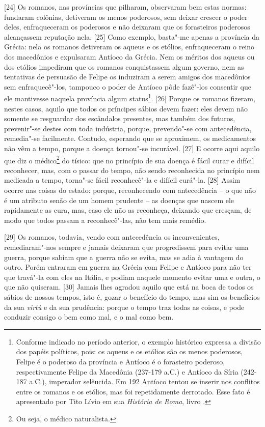 {[}24{]} Os romanos, nas províncias que pilharam, observaram bem estas
normas: fundaram colônias, detiveram os menos poderosos, sem deixar
crescer o poder deles, enfraqueceram os poderosos e não deixaram que os
forasteiros poderosos alcançassem reputação nela. {[}25{]} Como exemplo,
basta"-me apenas a província da Grécia: nela os romanos detiveram os
aqueus e os etólios, enfraqueceram o reino dos macedônios e expulsaram
Antíoco da Grécia. Nem os méritos dos aqueus ou dos etólios impediram
que os romanos conquistassem algum governo, nem as tentativas de
persuasão de Felipe os induziram a serem amigos dos macedônios sem
enfraquecê"-los, tampouco o poder de Antíoco pôde fazê"-los consentir que
ele mantivesse naquela província algum status\footnote{Conforme indicado
  no período anterior, o exemplo histórico expressa a divisão dos papéis
  políticos, pois: os aqueus e os etólios são os menos poderosos, Felipe
  é o poderoso da província e Antíoco é o forasteiro poderoso,
  respectivamente Felipe  da Macedônia (237-179 a.C.) e Antíoco  da
  Síria (242- 187 a.C.), imperador selêucida. Em 192 Antíoco tentou se
  inserir nos conflitos entre os romanos e os etólios, mas foi
  repetidamente derrotado. Esse fato é apresentado por Tito Lívio em sua
  \emph{História de Roma}, livro .}. {[}26{]} Porque os romanos
fizeram, nestes casos, aquilo que todos os príncipes sábios devem fazer:
eles devem não somente se resguardar dos escândalos presentes, mas
também dos futuros, prevenir"-se destes com toda indústria, porque,
prevendo"-se com antecedência, remedia"-se facilmente. Contudo, esperando
que se aproximem, os medicamentos não vêm a tempo, porque a doença
tornou"-se incurável. {[}27{]} E ocorre aqui aquilo que diz o
médico\footnote{Ou seja, o médico naturalista.} do tísico: que no
princípio de sua doença é fácil curar e difícil reconhecer, mas, com o
passar do tempo, não sendo reconhecida no princípio nem medicada a
tempo, torna"-se fácil reconhecê"-la e difícil curá"-la. {[}28{]} Assim
ocorre nas coisas do estado: porque, reconhecendo com antecedência -- o
que não é um atributo senão de um homem prudente -- as doenças que
nascem ele rapidamente as cura, mas, caso ele não as reconheça, deixando
que cresçam, de modo que todos passam a reconhecê"-las, não tem mais
remédio.

{[}29{]} Os romanos, todavia, vendo com antecedência os inconvenientes,
remediaram"-nos sempre e jamais deixaram que progredissem para evitar uma
guerra, porque sabiam que a guerra não se evita, mas se adia à vantagem
do outro. Porém entraram em guerra na Grécia com Felipe e Antíoco para
não ter que travá"-la com eles na Itália, e podiam naquele momento evitar
uma e outra, o que não quiseram. {[}30{]} Jamais lhes agradou aquilo que
está na boca de todos os sábios de nossos tempos, isto é, gozar o
benefício do tempo, mas sim os benefícios da sua \emph{virtù} e da sua
prudência: porque o tempo traz todas as coisas, e pode conduzir consigo
o bem como mal, e o mal como bem.

